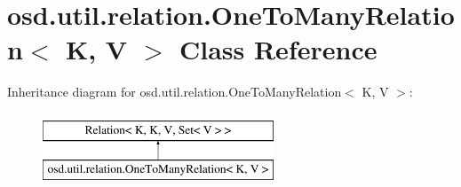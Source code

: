 \hypertarget{classosd_1_1util_1_1relation_1_1_one_to_many_relation_3_01_k_00_01_v_01_4}{\section{osd.\-util.\-relation.\-One\-To\-Many\-Relation$<$ K, V $>$ Class Reference}
\label{classosd_1_1util_1_1relation_1_1_one_to_many_relation_3_01_k_00_01_v_01_4}
}
Inheritance diagram for osd.\-util.\-relation.\-One\-To\-Many\-Relation$<$ K, V $>$\-:\begin{figure}[H]
\begin{center}
\leavevmode
\includegraphics[height=2.000000cm]{classosd_1_1util_1_1relation_1_1_one_to_many_relation_3_01_k_00_01_v_01_4}
\end{center}
\end{figure}
